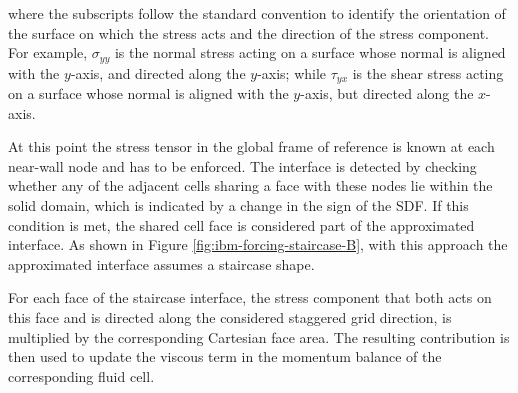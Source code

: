 \documentclass[12pt, a4paper, twoside, openright]{book}
\begin{document}
where the subscripts follow the standard convention to identify the orientation of the surface on which the stress acts and the direction of the stress component. For example, $\sigma_{yy}$ is the normal stress acting on a surface whose normal is aligned with the $y$-axis, and directed along the $y$-axis; while $\tau_{yx}$ is the shear stress acting on a surface whose normal is aligned with the $y$-axis, but directed along the $x$-axis.

At this point the stress tensor in the global frame of reference is known at each near-wall node and has to be enforced. The interface is detected by checking whether any of the adjacent cells sharing a face with these nodes lie within the solid domain, which is indicated by a change in the sign of the SDF. If this condition is met, the shared cell face is considered part of the approximated interface. As shown in Figure \ref{fig:ibm-forcing-staircase-B}, with this approach the approximated interface assumes a staircase shape. 

For each face of the staircase interface, the stress component that both acts on this face and is directed along the considered staggered grid direction, is multiplied by the corresponding Cartesian face area. The resulting contribution is then used to update the viscous term in the momentum balance of the corresponding fluid cell. 
\end{document}
